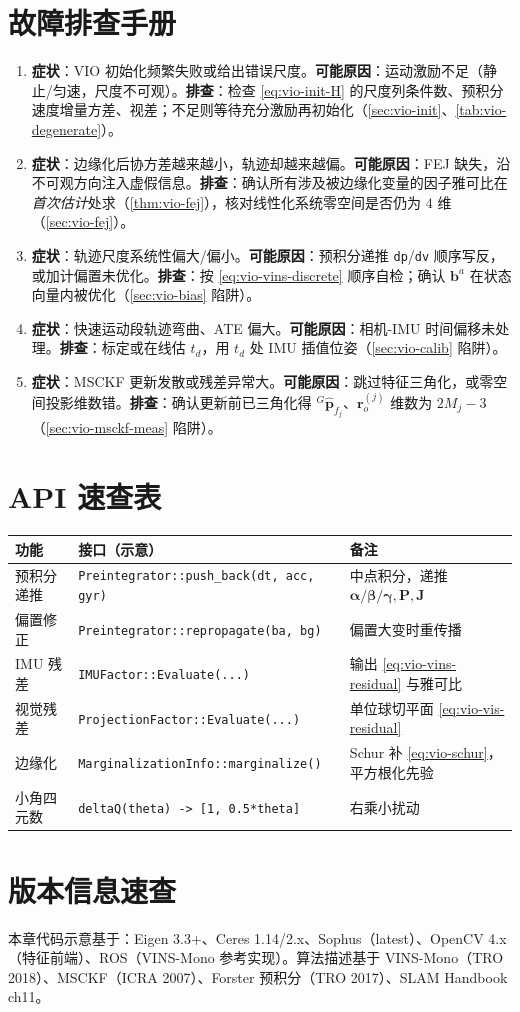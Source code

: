 \section*{故障排查手册}
\begin{enumerate}
  \item \textbf{症状}：VIO 初始化频繁失败或给出错误尺度。\textbf{可能原因}：运动激励不足（静止/匀速，尺度不可观）。\textbf{排查}：检查 \cref{eq:vio-init-H} 的尺度列条件数、预积分速度增量方差、视差；不足则等待充分激励再初始化（\cref{sec:vio-init}、\cref{tab:vio-degenerate}）。
  \item \textbf{症状}：边缘化后协方差越来越小，轨迹却越来越偏。\textbf{可能原因}：FEJ 缺失，沿不可观方向注入虚假信息。\textbf{排查}：确认所有涉及被边缘化变量的因子雅可比在\emph{首次估计}处求（\cref{thm:vio-fej}），核对线性化系统零空间是否仍为 $4$ 维（\cref{sec:vio-fej}）。
  \item \textbf{症状}：轨迹尺度系统性偏大/偏小。\textbf{可能原因}：预积分递推 \texttt{dp}/\texttt{dv} 顺序写反，或加计偏置未优化。\textbf{排查}：按 \cref{eq:vio-vins-discrete} 顺序自检；确认 $\mathbf{b}^a$ 在状态向量内被优化（\cref{sec:vio-bias} 陷阱）。
  \item \textbf{症状}：快速运动段轨迹弯曲、ATE 偏大。\textbf{可能原因}：相机-IMU 时间偏移未处理。\textbf{排查}：标定或在线估 $t_d$，用 $t_d$ 处 IMU 插值位姿（\cref{sec:vio-calib} 陷阱）。
  \item \textbf{症状}：MSCKF 更新发散或残差异常大。\textbf{可能原因}：跳过特征三角化，或零空间投影维数错。\textbf{排查}：确认更新前已三角化得 ${}^G\hat{\mathbf{p}}_{f_j}$、$\mathbf{r}_o^{(j)}$ 维数为 $2M_j-3$（\cref{sec:vio-msckf-meas} 陷阱）。
\end{enumerate}

\section*{API 速查表}
\begin{table}[H]\centering\small
\begin{tabular}{lll}
\toprule
功能 & 接口（示意） & 备注 \\
\midrule
预积分递推 & \texttt{Preintegrator::push\_back(dt, acc, gyr)} & 中点积分，递推 $\boldsymbol{\alpha}/\boldsymbol{\beta}/\boldsymbol{\gamma},\mathbf{P},\mathbf{J}$ \\
偏置修正 & \texttt{Preintegrator::repropagate(ba, bg)} & 偏置大变时重传播 \\
IMU 残差 & \texttt{IMUFactor::Evaluate(...)} & 输出 \cref{eq:vio-vins-residual} 与雅可比 \\
视觉残差 & \texttt{ProjectionFactor::Evaluate(...)} & 单位球切平面 \cref{eq:vio-vis-residual} \\
边缘化 & \texttt{MarginalizationInfo::marginalize()} & Schur 补 \cref{eq:vio-schur}，平方根化先验 \\
小角四元数 & \texttt{deltaQ(theta) -> [1, 0.5*theta]} & 右乘小扰动 \\
\bottomrule
\end{tabular}
\end{table}

\section*{版本信息速查}
本章代码示意基于：Eigen 3.3+、Ceres 1.14/2.x、Sophus（latest）、OpenCV 4.x（特征前端）、ROS（VINS-Mono 参考实现）。算法描述基于 VINS-Mono（TRO 2018）、MSCKF（ICRA 2007）、Forster 预积分（TRO 2017）、SLAM Handbook ch11。
